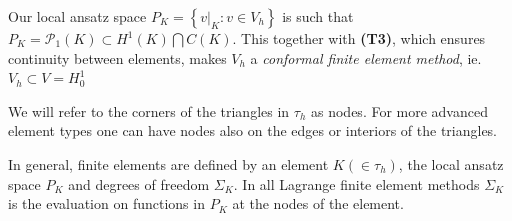 \documentclass[../Main/main.tex]{subfiles}
\begin{document}
	\begin{remark}
	Our local ansatz space $P_K = \left \{ v|_K:v\in V_h \right \}$ is such that $P_K = \mathcal{P}_1(K) \subset H^1(K) \bigcap C(K)$. This together with \textbf{(T3)}, which ensures continuity between elements, makes $V_h$ a \emph{conformal finite element method}, ie. $V_h \subset V = H_0^1$
	\end{remark}
	\begin{remark}[Nodes]
		We will refer to the corners of the triangles in $\tau_h$ as nodes. For more advanced element types one can have nodes also on the edges or interiors of the triangles.
	\end{remark}
	\begin{remark}
		In general, finite elements are defined by an element $K(\in \tau_h)$, the local ansatz space $P_K$ and degrees of freedom $\Sigma_K$. In all Lagrange finite element methods $\Sigma_K$ is the evaluation on functions in $P_K$ at the nodes of the element.
	\end{remark}
\end{document}
